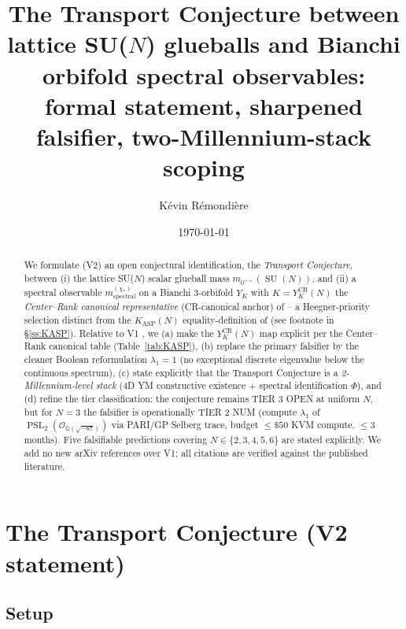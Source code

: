 \documentclass[11pt,a4paper,reqno]{amsart}
\title[Transport Conjecture V2]
  {The Transport Conjecture between lattice SU($N$) glueballs and Bianchi
   orbifold spectral observables: formal statement, sharpened falsifier,
   two-Millennium-stack scoping}
\author[K.~R\'emondi\`ere]{K\'evin R\'emondi\`ere}
\date{\today}
\theoremstyle{definition}
\DeclareMathOperator{\PSL}{PSL}
\DeclareMathOperator{\SU}{SU}
\newcommand{\YK}{Y_K}
\newcommand{\KASP}{K_{\mathrm{ASP}}}
\newcommand{\YKCR}{Y_K^{\mathrm{CR}}}
\newcommand{\QQ}{\mathbb{Q}}
\begin{document}
\begin{abstract}
We formulate (V2) an open conjectural identification, the \emph{Transport Conjecture}, between (i) the lattice SU($N$) scalar glueball mass $m_{0^{++}}(\SU(N))$, and (ii) a spectral observable $m^{(\chi_*)}_{\mathrm{spectral}}$ on a Bianchi 3-orbifold $\YK$ with $K = \YKCR(N)$ the \emph{Center--Rank canonical representative} (CR-canonical anchor) of \cite{Remondiere2026CenterRank} -- a Heegner-priority selection distinct from the $\KASP(N)$ equality-definition of \cite{Remondiere2026KASPmini} (see footnote in \S\ref{ss:KASP}). Relative to V1 \cite{Remondiere2026TransportV1}, we (a) make the $\YKCR(N)$ map explicit per the Center--Rank canonical table (Table~\ref{tab:KASP}), (b) replace the primary falsifier by the cleaner Boolean reformulation $\lambda_1 = 1$ (no exceptional discrete eigenvalue below the continuous spectrum), (c) state explicitly that the Transport Conjecture is a \emph{2-Millennium-level stack} (4D YM constructive existence + spectral identification $\Phi$), and (d) refine the tier classification: the conjecture remains TIER 3 OPEN at uniform $N$, but for $N=3$ the falsifier is operationally TIER 2 NUM (compute $\lambda_1$ of $\PSL_2(\mathcal{O}_{\QQ(\sqrt{-67})})$ via PARI/GP Selberg trace, budget $\leq \$50$ KVM compute, $\leq 3$ months). Five falsifiable predictions covering $N\in\{2,3,4,5,6\}$ are stated explicitly. We add no new arXiv references over V1; all citations are verified against the published literature.
\end{abstract}

\maketitle

\section{The Transport Conjecture (V2 statement)}\label{sec:conjecture}

\subsection{Setup}\label{ss:setup}
\end{document}
